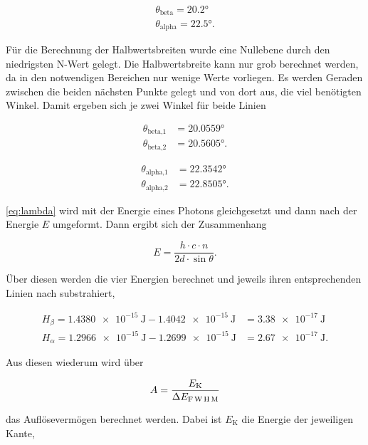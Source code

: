 \begin{align}
    \theta _\text{beta} = \ang{20.2}\\
    \theta _\text{alpha} = \ang{22.5}.
\end{align}

Für die Berechnung der Halbwertsbreiten wurde eine Nullebene durch den niedrigsten N-Wert gelegt.
Die Halbwertsbreite kann nur grob berechnet werden, da in den notwendigen Bereichen nur wenige Werte vorliegen.
Es werden Geraden zwischen die beiden nächsten Punkte gelegt und von dort aus, die viel benötigten Winkel.
Damit ergeben sich je zwei Winkel für beide Linien

\begin{align*}
    \theta _\text{beta,1} &= \ang{20.0559}\\
    \theta _\text{beta,2} &= \ang{20.5605}.
\end{align*}

\begin{align*}
    \theta _\text{alpha,1} &= \ang{22.3542}\\
    \theta _\text{alpha,2} &= \ang{22.8505}.
\end{align*}

\eqref{eq:lambda} wird mit der Energie eines Photons gleichgesetzt und dann nach der Energie $E$ umgeformt.
Dann ergibt sich der Zusammenhang

\begin{equation}
    E = \frac{h \cdot c \cdot n}{2d \cdot \sin{\theta}}.
    \label{eq:energie}
\end{equation}

Über diesen werden die vier Energien berechnet und jeweils ihren entsprechenden Linien nach substrahiert,

\begin{align*}
    H_ \beta = \SI{1.4380e-15}{\joule} - \SI{1.4042e-15}{\joule} &= \SI{3.38e-17}{\joule}\\
    H_ \alpha = \SI{1.2966e-15}{\joule} - \SI{1.2699e-15}{\joule} &= \SI{2.67e-17}{\joule}.
\end{align*}

Aus diesen wiederum  wird über 

\begin{equation}
    A = \frac{E_\text{K}}{\Delta E_ \text{F\,W\,H\,M}}
    \label{eq:aufloes}
\end{equation}

das Auflösevermögen berechnet werden.
Dabei ist $E_\text{K}$ die Energie der jeweiligen Kante, 

